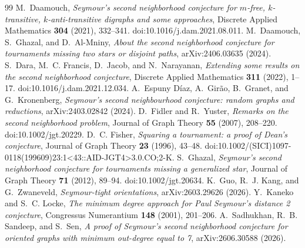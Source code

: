 \documentclass[10pt,a4paper]{amsart}
\begin{document}
\begin{thebibliography}{99}
 M.~Daamouch, \emph{Seymour's second neighborhood conjecture for $m$-free, $k$-transitive, $k$-anti-transitive digraphs and some approaches}, Discrete Applied Mathematics \textbf{304} (2021), 332--341. doi:10.1016/j.dam.2021.08.011.
 M.~Daamouch, S.~Ghazal, and D.~Al-Mniny, \emph{About the second neighborhood conjecture for tournaments missing two stars or disjoint paths}, arXiv:2406.03635 (2024).
 S.~Dara, M.~C. Francis, D.~Jacob, and N.~Narayanan, \emph{Extending some results on the second neighborhood conjecture}, Discrete Applied Mathematics \textbf{311} (2022), 1--17. doi:10.1016/j.dam.2021.12.034.
 A.~Espuny D\'iaz, A.~Gir\~ao, B.~Granet, and G.~Kronenberg, \emph{Seymour's second neighbourhood conjecture: random graphs and reductions}, arXiv:2403.02842 (2024).
 D.~Fidler and R.~Yuster, \emph{Remarks on the second neighborhood problem}, Journal of Graph Theory \textbf{55} (2007), 208--220. doi:10.1002/jgt.20229.
 D.~C. Fisher, \emph{Squaring a tournament: a proof of Dean's conjecture}, Journal of Graph Theory \textbf{23} (1996), 43--48. doi:10.1002/(SICI)1097-0118(199609)23:1<43::AID-JGT4>3.0.CO;2-K.
 S.~Ghazal, \emph{Seymour's second neighborhood conjecture for tournaments missing a generalized star}, Journal of Graph Theory \textbf{71} (2012), 89--94. doi:10.1002/jgt.20634.
 K.~Guo, R.~J. Kang, and G.~Zwaneveld, \emph{Seymour-tight orientations}, arXiv:2603.29626 (2026).
 Y.~Kaneko and S.~C. Locke, \emph{The minimum degree approach for Paul Seymour's distance 2 conjecture}, Congressus Numerantium \textbf{148} (2001), 201--206.
 A.~Sadhukhan, R.~B. Sandeep, and S.~Sen, \emph{A proof of Seymour's second neighborhood conjecture for oriented graphs with minimum out-degree equal to 7}, arXiv:2606.30588 (2026).
\end{thebibliography}
\end{document}
